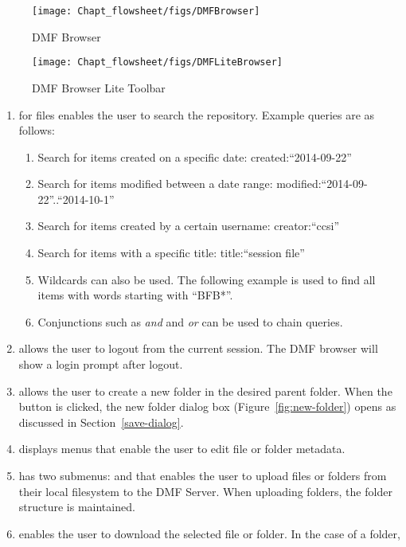 {\begin{figure}[H]
  \centering
  \texttt{[image: Chapt\_flowsheet/figs/DMFBrowser]}
  \caption{DMF Browser}
  \label{fig:browser}
\end{figure}

\begin{figure}[H]
  \centering
  \texttt{[image: Chapt\_flowsheet/figs/DMFLiteBrowser]}
  \caption{DMF Browser Lite Toolbar}
  \label{fig:lite-browser}
\end{figure}

\begin{enumerate}
\item {} for files enables the user to search the repository. Example queries are as follows:
  \begin {enumerate}[label=(\alph*)]
  \item Search for items created on a specific date: created:``2014-09-22''
  \item Search for items modified between a date range: modified:``2014-09-22''..``2014-10-1''
  \item Search for items created by a certain username: creator:``ccsi''
  \item Search for items with a specific title: title:``session file''
  \item Wildcards can also be used. The following example is used to find all items with words starting with ``BFB*''.
  \item Conjunctions such as \textit{and} and \textit{or} can be used to chain queries.
  \end {enumerate}
\item {} allows the user to logout from the current session. The DMF browser will show a login prompt after logout.
\item {} allows the user to create a new folder in the desired parent folder. When the button is clicked,
  the new folder dialog box (Figure~\ref{fig:new-folder}) opens as discussed in Section~\ref{save-dialog}.
\item {} displays menus that enable the user to edit file or folder metadata.
\item {} has two submenus:  and 
  that enables the user to upload files or folders from their local filesystem to the DMF Server.
  When uploading folders, the folder structure is maintained.
\item {} enables the user to download the selected file or folder. In the case of a folder,

\end{enumerate}}
